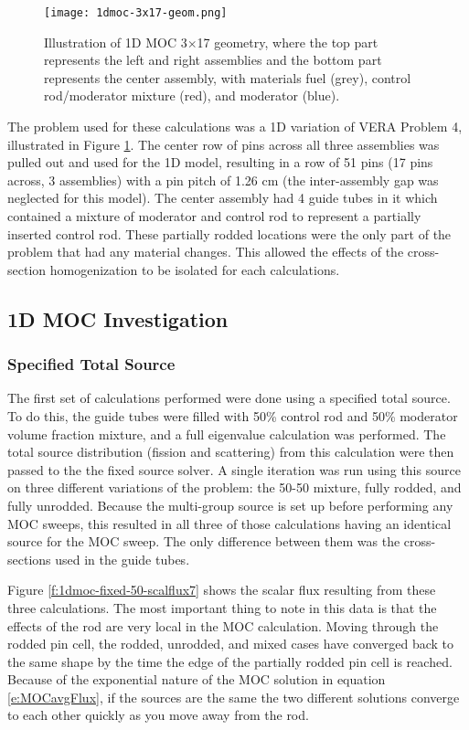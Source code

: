 \begin{figure}
    \centering
    \texttt{[image: 1dmoc-3x17-geom.png]}
    \caption[Illustration of 1D MOC 3x17 Geometry]{Illustration of 1D MOC 3$\times$17 geometry, where the top part represents the left and right assemblies and the bottom part represents the center assembly, with materials fuel (grey), control rod/moderator mixture (red), and moderator (blue).}\label{f:1dmoc-17x17-geom}
\end{figure}

The problem used for these calculations was a 1D variation of VERA Problem 4, illustrated in Figure \ref{f:1dmoc-17x17-geom}.  The center row of pins across all three assemblies was pulled out and used for the 1D model, resulting in a row of 51 pins (17 pins across, 3 assemblies) with a pin pitch of 1.26 cm (the inter-assembly gap was neglected for this model).  The center assembly had 4 guide tubes in it which contained a mixture of moderator and control rod to represent a partially inserted control rod.  These partially rodded locations were the only part of the problem that had any material changes.  This allowed the effects of the cross-section homogenization to be isolated for each calculations.

\subsection{1D MOC Investigation}

\subsubsection{Specified Total Source}

The first set of calculations performed were done using a specified total source.  To do this, the guide tubes were filled with 50\% control rod and 50\% moderator volume fraction mixture, and a full eigenvalue calculation was performed.  The total source distribution (fission and scattering) from this calculation were then passed to the the fixed source solver.  A single iteration was run using this source on three different variations of the problem: the 50-50 mixture, fully rodded, and fully unrodded.  Because the multi-group source is set up before performing any MOC sweeps, this resulted in all three of those calculations having an identical source for the MOC sweep.  The only difference between them was the cross-sections used in the guide tubes.

Figure \ref{f:1dmoc-fixed-50-scalflux7} shows the scalar flux resulting from these three calculations.  The most important thing to note in this data is that the effects of the rod are very local in the MOC calculation.  Moving through the rodded pin cell, the rodded, unrodded, and mixed cases have converged back to the same shape by the time the edge of the partially rodded pin cell is reached.  Because of the exponential nature of the MOC solution in equation \ref{e:MOCavgFlux}, if the sources are the same the two different solutions converge to each other quickly as you move away from the rod.

